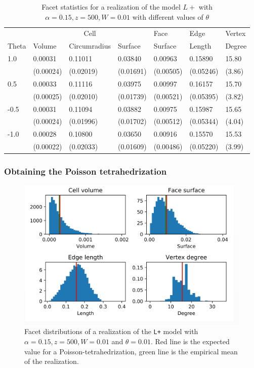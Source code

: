 \begin{table}\centering
{}
\begin{tabular}{lllllll}\toprule
& \multicolumn{3}{c}{Cell} & Face & Edge & Vertex \\ 
\cmidrule(lr){2-4} \cmidrule(lr){5-5} \cmidrule(lr){6-6} \cmidrule(lr){7-7}
Theta & Volume & Circumradius & Surface & Surface & Length & Degree \\
\midrule
1.0 &  0.00031 & 0.11011 & 0.03840 & 0.00963 & 0.15890 & 15.80\\
&  (0.00024) &  (0.02019) &  (0.01691) &  (0.00505) &  (0.05246) &  (3.86) \\
0.5 &  0.00033 & 0.11116 & 0.03975 & 0.00997 & 0.16157 & 15.70\\
&  (0.00025) &  (0.02010) &  (0.01739) &  (0.00521) &  (0.05395) &  (3.82) \\
-0.5 &  0.00031 & 0.11094 & 0.03882 & 0.00975 & 0.15987 & 15.65\\
&  (0.00024) &  (0.01996) &  (0.01702) &  (0.00512) &  (0.05344) &  (4.04) \\
-1.0 &  0.00028 & 0.10800 & 0.03650 & 0.00916 & 0.15570 & 15.53\\
&  (0.00022) &  (0.02033) &  (0.01609) &  (0.00486) &  (0.05220) &  (3.99) \\
\bottomrule
\end{tabular}
\caption{Facet statistics for a realization of the model $L+$ with $\alpha = 0.15, z=500, W=0.01$ with different values of $\theta$}
\end{table}



\subsubsection{Obtaining the Poisson tetrahedrization}

\begin{figure}
  \centering
    \includegraphics[width=1\textwidth]{../img/numeric/poisson.png}
  \caption{Facet distributions of a realization of the \texttt{L+} model with $\alpha=0.15,z=500,W=0.01$ and $\theta = 0.01$. Red line is the expected value for a Poisson-tetrahedrization, green line is the empirical mean of the realization.  }
\end{figure}



